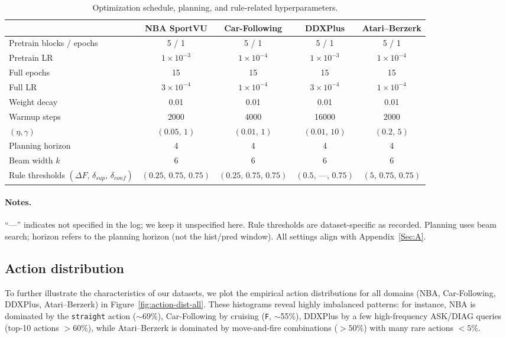 \documentclass{article} %
\begin{document}
\begin{table}[t]
\centering
\small
\setlength{\tabcolsep}{6pt}
\renewcommand{\arraystretch}{1.12}
\caption{Optimization schedule, planning, and rule-related hyperparameters.}
\label{tab:exp-params-optim-T}
\begin{tabular}{lcccc}
\toprule
 & \textbf{NBA SportVU} & \textbf{Car-Following} & \textbf{DDXPlus} & \textbf{Atari–Berzerk} \\
\midrule
Pretrain blocks / epochs
 & 5 / 1 & 5 / 1 & 5 / 1 & 5 / 1 \\
Pretrain LR
 & $1{\times}10^{-3}$ & $1{\times}10^{-4}$ & $1{\times}10^{-3}$ & $1{\times}10^{-4}$ \\
Full epochs
 & 15 & 15 & 15 & 15 \\
Full LR
 & $3{\times}10^{-4}$ & $1{\times}10^{-4}$ & $3{\times}10^{-4}$ & $1{\times}10^{-4}$ \\
Weight decay
 & 0.01 & 0.01 & 0.01 & 0.01 \\
Warmup steps
 & 2000 & 4000 & 16000 & 2000 \\
$(\eta,\gamma)$
 & $(0.05,\,1)$ & $(0.01,\,1)$ & $(0.01,\,10)$ & $(0.2,\,5)$ \\
Planning horizon
 & 4 & 4 & 4 & 4 \\
Beam width $k$
 & 6 & 6 & 6 & 6 \\
\makecell[l]{Rule thresholds \\ $(\Delta F,\,\delta_{sup},\,\delta_{conf})$}
 & $(0.25,\,0.75,\,0.75)$
 & $(0.25,\,0.75,\,0.75)$
 & $(0.5,\,\text{—},\,0.75)$
 & $(5,\,0.75,\,0.75)$ \\
\bottomrule
\end{tabular}
\end{table}

\paragraph{Notes.}
“—” indicates not specified in the log; we keep it unspecified here. Rule thresholds are dataset-specific as recorded. Planning uses beam search; horizon refers to the planning horizon (not the hist/pred window). All settings align with Appendix~\ref{Sec:A}.

\subsection{Action distribution}
\label{Sec:B8}

To further illustrate the characteristics of our datasets, we plot the empirical
action distributions for all domains (NBA, Car-Following, DDXPlus, Atari–Berzerk)
in Figure~\ref{fig:action-dist-all}. These histograms reveal highly imbalanced
patterns: for instance, NBA is dominated by the \texttt{straight} action
($\sim$69\%), Car-Following by cruising (\texttt{F}, $\sim$55\%), DDXPlus by a few
high-frequency ASK/DIAG queries (top-10 actions $>60\%$), while Atari–Berzerk is
dominated by move-and-fire combinations ($>50\%$) with many rare actions
$<5\%$.
\end{document}
